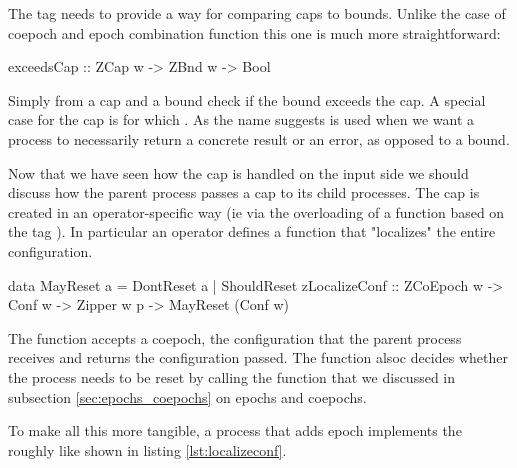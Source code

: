 The  tag needs to provide a way for comparing caps
to bounds. Unlike the case of coepoch and epoch combination function
this one is much more straightforward:

\begin{haskellcode}
exceedsCap :: ZCap w -> ZBnd w -> Bool
\end{haskellcode}

Simply from a cap and a bound check if the bound exceeds the cap. A
special case for the cap is  for which
. As the name suggests
 is used when we want a process to necessarily
return a concrete result or an error, as opposed to a bound.

Now that we have seen how the cap is handled on the input side we
should discuss how the parent process passes a cap to its child
processes. The cap is created in an operator-specific way (ie via the
overloading of a function based on the tag ). In particular an
operator defines a function that "localizes" the entire configuration.

\begin{haskellcode}
data MayReset a = DontReset a | ShouldReset
zLocalizeConf :: ZCoEpoch w -> Conf w -> Zipper w p -> MayReset (Conf w)
\end{haskellcode}

The  function accepts a coepoch, the configuration
that the parent process receives and returns the configuration
passed. The  function alsoc decides whether the
process needs to be reset by calling the 
function that we discussed in subsection \ref{sec:epochs_coepochs} on
epochs and coepochs.

To make all this more tangible, a process that adds epoch implements
the  roughly like shown in listing
\ref{lst:localizeconf}.

